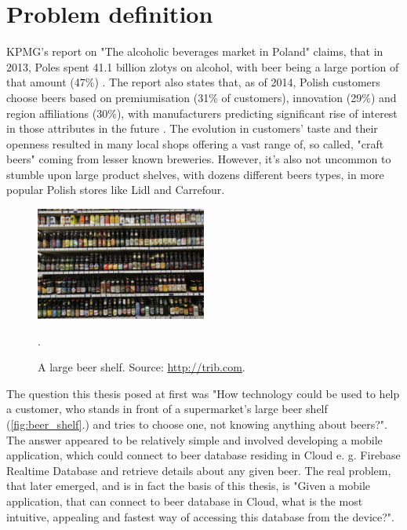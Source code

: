 \documentclass[11pt]{article}
\begin{document}
\thispagestyle{empty}
\tableofcontents
\clearpage

\section{Problem definition}
\setcounter{page}{1}
KPMG's report on "The alcoholic beverages market in Poland" claims, that in 2013, Poles spent 41.1 billion zlotys on alcohol, with beer being a large portion of that amount (47\%) \cite{kpmg_alco}. The report also states that, as of 2014, Polish customers choose beers based on premiumisation (31\% of customers), innovation (29\%) and region affiliations (30\%), with manufacturers predicting significant rise of interest in those attributes in the future \cite{kpmg_alco}. The evolution in customers' taste and their openness resulted in many local shops offering a vast range of, so called, "craft beers" coming from lesser known breweries. However, it's also not uncommon to stumble upon large product shelves, with dozens different beers types, in more popular Polish stores like Lidl and Carrefour.\\

\begin{figure}[h]
\includegraphics[width=0.5\textwidth]{beer_shelf}
\centering
\caption{A large beer shelf. Source: \protect \url{http://trib.com}.}.
\label{fig:beer_shelf}
\end{figure}

The question this thesis posed at first was "How technology could be used to help a customer, who stands in front of a supermarket's large beer shelf (\autoref{fig:beer_shelf}.) and tries to choose one, not knowing anything about beers?". The answer appeared to be relatively simple and involved developing a mobile application, which could connect to beer database residing in Cloud e. g. Firebase Realtime Database and retrieve details about any given beer. The real problem, that later emerged, and is in fact the basis of this thesis, is "Given a mobile application, that can connect to beer database in Cloud, what is the most intuitive, appealing and fastest way of accessing this database from the device?".
\clearpage
\end{document}
